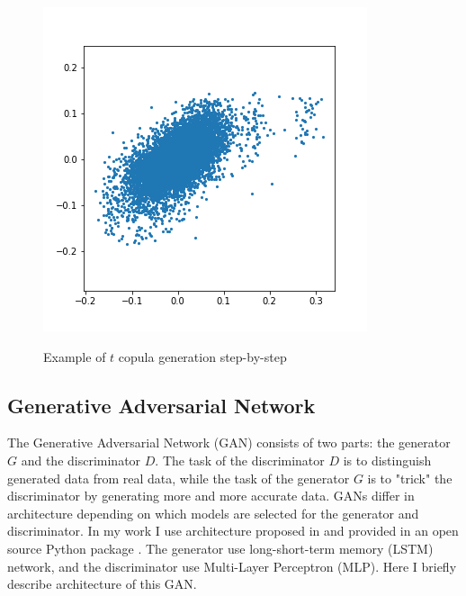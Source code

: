 \documentclass{article}
\begin{document}
\begin{figure}[!ht]
\begin{minipage}{.33\linewidth}
        \label{fig:copula2}
    \end{minipage}
    \begin{minipage}{.33\linewidth}
        \centering
        \includegraphics[width=\textwidth]{pics/copula3.png}
        \label{fig:copula3}
    \end{minipage}
    \caption{Example of $t$ copula generation step-by-step}
    \label{fig:mem}
\end{figure}

\subsection{Generative Adversarial Network}
\label{section:gan}
The Generative Adversarial Network (GAN) consists of two parts: the generator $G$ and the discriminator $D$. The task of the discriminator $D$ is to distinguish generated data from real data, while the task of the generator $G$ is to "trick" the discriminator by generating more and more accurate data. GANs differ in architecture depending on which models are selected for the generator and discriminator. In my work I use architecture proposed in \cite{xu2018synthesizing} and provided in an open source Python package \cite{tgan}. The generator use long-short-term memory (LSTM) network, and the discriminator use Multi-Layer Perceptron (MLP). Here I briefly describe architecture of this GAN.
\end{document}
